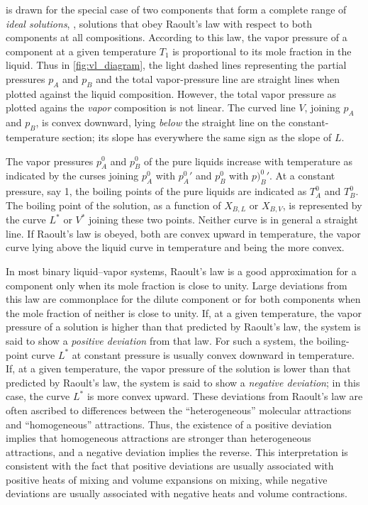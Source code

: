  is drawn for the special case of two components that form a complete range of \emph{ideal solutions}, \ie, solutions that obey Raoult's law with respect to both components at all compositions. 
According to this law, the vapor pressure of a component at a given temperature \(T_1\) is proportional to its mole fraction in the liquid. 
Thus in \cref{fig:vl_diagram}, the light  dashed lines representing the partial pressures \(p_A\) and \(p_B\) and the total vapor-pressure line  are straight lines when plotted against the liquid composition. 
However, the total vapor pressure as plotted agains the \emph{vapor} composition is not linear. 
The curved line \(V\), joining \(p_A\) and \(p_B\), is convex downward, lying \emph{below} the straight line on the constant-temperature section; its slope has everywhere the same sign as the slope of \(L\). 

The vapor pressures \(p_A^0\) and \(p_B^0\) of the pure liquids increase with temperature as indicated by the curses joining \(p_A^0\) with \(p_A^0\prime\) and \(p_B^0\) with \(p)_B^0\prime\).
At a constant pressure, say \qty{1}{\atm}, the boiling points of the pure liquids are indicated as \(T_A^0\) and \(T_B^0\). The boiling point of the solution, as a function of \(X_{B,L}\) or \(X_{B,V}\), is represented by the curve \(L^*\) or \(V^*\) joining these two points. 
Neither curve is in general a straight line. 
If Raoult's law is obeyed, both are convex upward in temperature, the vapor curve lying above the liquid curve in temperature and being the more convex. 

In most binary liquid--vapor systems, Raoult's law is a good approximation for a component only when its mole fraction is close to unity. 
Large deviations from this law are commonplace for the dilute component or for both components when the mole fraction of neither is close to unity. 
If, at a given temperature, the vapor pressure of a solution is higher than that predicted by Raoult's law, the system is said to show a \emph{positive deviation} from that law. 
For such a system, the boiling-point curve \(L^*\) at constant pressure is usually convex downward in temperature. 
If, at a given temperature, the vapor pressure of the solution is lower than that predicted by Raoult's law, the system is said to show a \emph{negative deviation}; in this case, the curve \(L^*\) is more convex upward. 
These deviations from Raoult's law are often ascribed to differences between the ``heterogeneous'' molecular attractions and ``homogeneous'' attractions. 
Thus, the existence of a positive deviation implies that homogeneous attractions are stronger than heterogeneous attractions, and a negative deviation implies the reverse. 
This interpretation is consistent with the fact that positive deviations are usually associated with positive heats of mixing and volume expansions on mixing, while negative deviations are usually associated with negative heats and volume contractions. 


